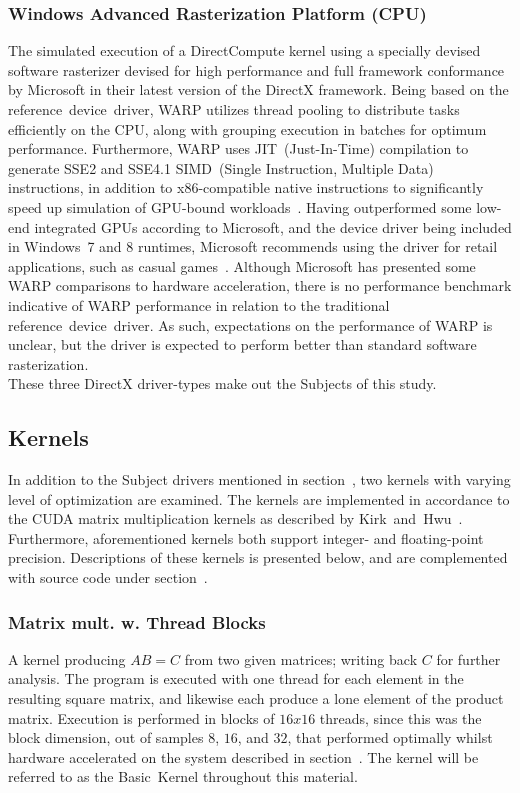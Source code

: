 \subsubsection{Windows Advanced Rasterization Platform (CPU)}
The simulated execution of a DirectCompute kernel using a specially devised software rasterizer devised for high performance and full framework conformance by Microsoft in their latest version of the DirectX framework.
Being based on the reference~device~driver, WARP utilizes thread pooling to distribute tasks efficiently on the CPU, along with grouping execution in batches for optimum performance.
Furthermore, WARP uses JIT~(Just-In-Time) compilation to generate SSE2 and SSE4.1 SIMD~(Single Instruction, Multiple Data) instructions, in addition to x86-compatible native instructions to significantly speed up simulation of GPU-bound workloads~.
Having outperformed some low-end integrated GPUs according to Microsoft, and the device driver being included in Windows~7 and 8 runtimes, Microsoft recommends using the driver for retail applications, such as casual games~.
Although Microsoft has presented some WARP comparisons to hardware acceleration, there is no performance benchmark indicative of WARP performance in relation to the traditional reference~device~driver.
As such, expectations on the performance of WARP is unclear, but the driver is expected to perform better than standard software rasterization.\\

These three DirectX driver-types make out the Subjects of this study.

\subsection{Kernels}
\label{sec:contribution:kernels}
In addition to the Subject drivers mentioned in section~, two kernels with varying level of optimization are examined.
The kernels are implemented in accordance to the CUDA matrix multiplication kernels as described by Kirk~and~Hwu~\cite[p.~67, p.~87]{Kirk:2010:PMP:1841511}.
Furthermore, aforementioned kernels both support integer- and floating-point precision.
Descriptions of these kernels is presented below, and are complemented with source code under section~.

\subsubsection{Matrix mult. w. Thread Blocks}
A kernel producing $AB=C$ from two given matrices; writing back $C$ for further analysis.
The program is executed with one thread for each element in the resulting square matrix, and likewise each produce a lone element of the product matrix.
Execution is performed in blocks of $16x16$ threads, since this was the block dimension, out of samples $8$, $16$, and $32$, that performed optimally whilst hardware accelerated on the system described in section~.
The kernel will be referred to as the Basic~Kernel throughout this material.

